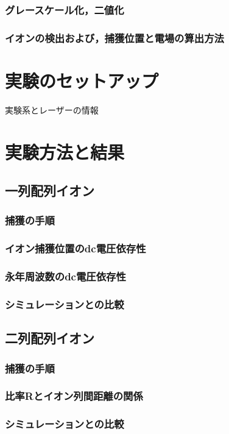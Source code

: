 \documentclass[a4j,10.5pt,titlepage]{jarticle}
\begin{document}
		\subsubsection{グレースケール化，二値化}
		\subsubsection{イオンの検出および，捕獲位置と電場の算出方法}
\clearpage
\section{実験のセットアップ}
実験系とレーザーの情報
\clearpage
\section{実験方法と結果}
	\subsection{一列配列イオン}
		\subsubsection{捕獲の手順}
		\subsubsection{イオン捕獲位置のdc電圧依存性}
		\subsubsection{永年周波数のdc電圧依存性}
		\subsubsection{シミュレーションとの比較}
	\subsection{二列配列イオン}
		\subsubsection{捕獲の手順}
		\subsubsection{比率Rとイオン列間距離の関係}
		\subsubsection{シミュレーションとの比較}
	
\end{document}
